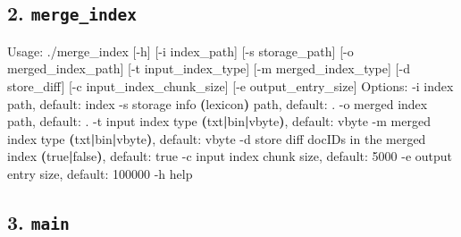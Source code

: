 \documentclass[12pt]{article}
\newenvironment{Shaded}{}{}
\newcommand{\ErrorTok}[1]{\textcolor[rgb]{1.00,0.00,0.00}{\textbf{\footnotesize #1}}}
\newcommand{\ExtensionTok}[1]{\footnotesize #1}
\newcommand{\FunctionTok}[1]{\textcolor[rgb]{0.02,0.16,0.49}{\footnotesize #1}}
\newcommand{\KeywordTok}[1]{\textcolor[rgb]{0.00,0.44,0.13}{\textbf{\footnotesize #1}}}
\newcommand{\NormalTok}[1]{\footnotesize #1}
\begin{document}
\hypertarget{2-mergeindex}{%
\subsection{\texorpdfstring{2.
\texttt{merge\_index}}{2. merge\_index}}\label{2-mergeindex}}

\begin{Shaded}
\begin{Highlighting}[]
\ExtensionTok{Usage:}\NormalTok{ ./merge\_index [{-}h] [{-}i index\_path] [{-}s storage\_path] [{-}o merged\_index\_path]}
        \ExtensionTok{[{-}t}\NormalTok{ input\_index\_type] [{-}m merged\_index\_type] [{-}d store\_diff]}
        \ExtensionTok{[{-}c}\NormalTok{ input\_index\_chunk\_size] [{-}e output\_entry\_size]}
\ExtensionTok{Options:}
        \ExtensionTok{{-}i}\NormalTok{      index path, default: index}
        \ExtensionTok{{-}s}\NormalTok{      storage info }\ErrorTok{(}\ExtensionTok{lexicon}\KeywordTok{)} \ExtensionTok{path,}\NormalTok{ default: .}
        \ExtensionTok{{-}o}\NormalTok{      merged index path, default: .}
        \ExtensionTok{{-}t}\NormalTok{      input index type }\ErrorTok{(}\ExtensionTok{txt}\KeywordTok{|}\ExtensionTok{bin}\KeywordTok{|}\ExtensionTok{vbyte}\KeywordTok{)}\ExtensionTok{,}\NormalTok{ default: vbyte}
        \ExtensionTok{{-}m}\NormalTok{      merged index type }\ErrorTok{(}\ExtensionTok{txt}\KeywordTok{|}\ExtensionTok{bin}\KeywordTok{|}\ExtensionTok{vbyte}\KeywordTok{)}\ExtensionTok{,}\NormalTok{ default: vbyte}
        \ExtensionTok{{-}d}\NormalTok{      store diff docIDs in the merged index }\ErrorTok{(}\FunctionTok{true}\KeywordTok{|}\FunctionTok{false}\KeywordTok{)}\ExtensionTok{,}\NormalTok{ default: true}
        \ExtensionTok{{-}c}\NormalTok{      input index chunk size, default: 5000}
        \ExtensionTok{{-}e}\NormalTok{      output entry size, default: 100000}
        \ExtensionTok{{-}h}\NormalTok{      help}
\end{Highlighting}
\end{Shaded}

\hypertarget{3-main}{%
\subsection{\texorpdfstring{3.
\texttt{main}}{3. main}}\label{3-main}}
\end{document}
